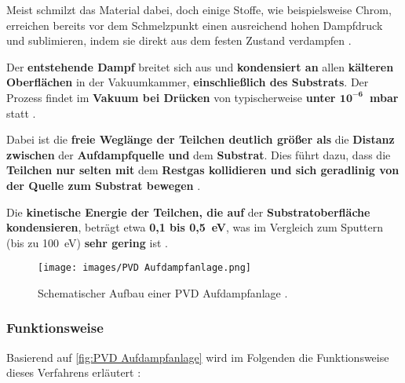 \documentclass{article} %
\begin{document}
\vspace{1em}

Meist schmilzt das Material dabei, doch einige Stoffe, wie beispielsweise Chrom, erreichen bereits vor dem Schmelzpunkt einen ausreichend hohen 
Dampfdruck und sublimieren, indem sie direkt aus dem festen Zustand verdampfen \cite{keplinger2024}.

\vspace{1em}

Der \textbf{entstehende Dampf} breitet sich aus und \textbf{kondensiert an} allen \textbf{kälteren Oberflächen} in der Vakuumkammer, 
\textbf{einschließlich des Substrats}. Der Prozess findet im \textbf{Vakuum bei Drücken} von typischerweise 
\textbf{unter $\mathbf{10^{-6}}$~mbar} statt \cite{keplinger2024}.

\vspace{1em}

Dabei ist die \textbf{freie Weglänge der Teilchen deutlich größer als} die \textbf{Distanz zwischen} der \textbf{Aufdampfquelle und} dem 
\textbf{Substrat}. Dies führt dazu, dass die \textbf{Teilchen nur selten mit} dem \textbf{Restgas kollidieren und sich geradlinig von der Quelle 
zum Substrat bewegen} \cite{keplinger2024}.

\vspace{1em}

Die \textbf{kinetische Energie der Teilchen, die auf} der \textbf{Substratoberfläche kondensieren}, beträgt etwa \textbf{0,1 bis 0,5~eV}, was im 
Vergleich zum Sputtern (bis zu 100~eV) \textbf{sehr gering} ist \cite{keplinger2024}.

\begin{figure}[htb!]
    \centering
    \texttt{[image: images/PVD Aufdampfanlage.png]} %
    \captionsetup{labelfont=bf} %
    \caption{Schematischer Aufbau einer PVD Aufdampfanlage \cite{keplinger2024}.}
    \label{fig:PVD Aufdampfanlage}
\end{figure}

\vspace{1em}
\subsubsection{Funktionsweise}
Basierend auf \autoref{fig:PVD Aufdampfanlage} wird im Folgenden die Funktionsweise dieses Verfahrens erläutert \cite{keplinger2024}:
\end{document}
